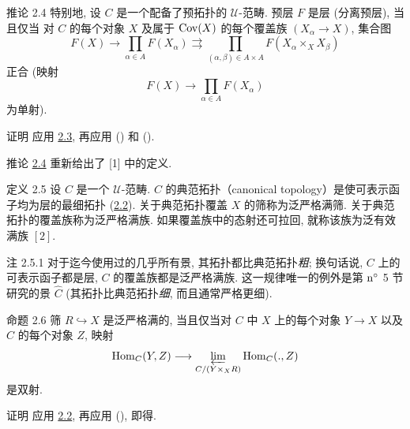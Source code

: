 \begin{enonce*}{推论 2.4}
特别地\pageoriginale{}, 设 $C$ 是一个配备了预拓扑的 $𝒰$-范畴.
预层 $F$ 是层 (\resp 分离预层), 当且仅当
对 $C$ 的每个对象 $X$ 及属于 $\operatorname{Cov}(X)$ 的每个覆盖族
$(X_{\alpha}\rightarrow X)$, 集合图
$$
F(X)\rightarrow \prod_{\alpha\in A}F(X_{\alpha})\rightrightarrows
\prod_{(\alpha,\beta)\in A\times A}F(X_{\alpha}\times_X X_{\beta})
$$
正合 (\resp 映射
$$
F(X)\longrightarrow \prod_{\alpha\in A}F(X_{\alpha})
$$
为单射).
\end{enonce*}

\begin{enonce*}[remark]{证明}
应用 \hyperref[II.cor2.3]{2.3}, 再应用
() 和 ().

推论 \hyperref[II.cor2.4]{2.4} 重新给出了 [1] 中的定义.
\end{enonce*}

\begin{enonce*}{定义 2.5}
设 $C$ 是一个 $𝒰$-范畴.
$C$ 的典范拓扑（canonical topology）是使可表示函子均为层的最细拓扑
(\hyperref[II.prop2.2]{2.2}).
关于典范拓扑覆盖 $X$ 的筛称为泛严格满筛.
关于典范拓扑的覆盖族称为泛严格满族.
如果覆盖族中的态射还可拉回, 就称该族为泛有效满族 $[2]$.
\end{enonce*}

\begin{enonce*}[remark]{注 2.5.1}
对于迄今使用过的几乎所有景, 其拓扑都比典范拓扑\emph{粗};
换句话说, $C$ 上的可表示函子都是层,
\ie $C$ 的覆盖族都是泛严格满族.
这一规律\pageoriginale{}唯一的例外是第 ${\rm n^{\circ}}$ 5 节研究的景 $\widehat{C}$
(其拓扑比典范拓扑\emph{细}, 而且通常严格更细).
\end{enonce*}

\begin{enonce*}{命题 2.6}
筛 $R\hookrightarrow X$ 是泛严格满的,
当且仅当对 $C$ 中 $X$ 上的每个对象 $Y\rightarrow X$
以及 $C$ 的每个对象 $Z$, 映射
$$
\operatorname{Hom}_C(Y,Z)\longrightarrow \varprojlim_{C/(Y\times_X R)}\operatorname{Hom}_C (.,
Z)
$$
是双射.
\end{enonce*}

\begin{enonce*}[remark]{证明}
应用 \hyperref[II.prop2.2]{2.2}, 再应用
(), 即得.
\end{enonce*}

